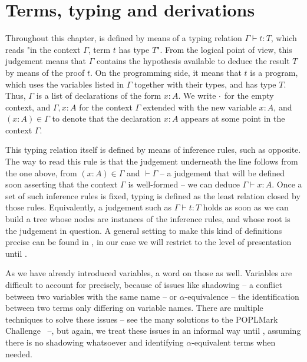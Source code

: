 \section{Terms, typing and derivations}

Throughout this chapter,  is defined by means of a typing relation $\Gamma \vdash t : T$, which reads "in the context $\Gamma$, term $t$ has type $T$".
From the logical point of view, this judgement means that $\Gamma$
contains the hypothesis available to deduce the
result $T$ by means of the proof $t$. On the programming side, it means that
$t$ is a program, which uses the variables listed in $\Gamma$ together with their types,
and has type $T$.
Thus, $\Gamma$ is a list of declarations of the form $x : A$. We write $\emptycon$ for the
empty context, and $\Gamma, x : A$ for the context $\Gamma$ extended with the new variable $x : A$, and $(x : A) \in \Gamma$ to denote that the declaration $x : A$ appears at some
point in the context $\Gamma$.

\begin{marginfigure}
  \begin{mathpar}
  \label{rule:cic-var}
  \end{mathpar}
\end{marginfigure}

This typing relation itself is defined by means of inference rules,
such as  opposite. The way to read this rule is that the judgement
underneath the line follows from the one above,
\ie from $(x : A) \in \Gamma$
and $\vdash \Gamma$ – a judgement that will be defined soon asserting that the context
$\Gamma$ is well-formed – we can deduce $\Gamma \vdash x : A$.
Once a set of such inference rules is fixed,
typing is defined as the least relation closed by those
rules. Equivalently, a judgement such as $\Gamma \vdash t : T$
holds as soon as we can build a tree whose nodes are instances of the inference rules,
and whose root is the judgement in question. A general setting
to make this kind of definitions precise can be found in ,
in our case we will restrict to the level of presentation
until .

As we have already introduced variables, a word on those as well. Variables are difficult
to account for precisely, because of issues like shadowing – a conflict between two variables
with the same name – or $\alpha$-equivalence – the identification between two terms
only differing on variable names. There are multiple techniques to solve these issues
– see the many solutions to the POPLMark Challenge~ –, 
but again, we treat these issues in an informal way until , assuming
there is no shadowing whatsoever and identifying $\alpha$-equivalent terms when needed.

